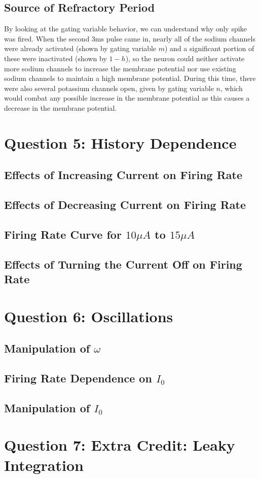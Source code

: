 \documentclass[11pt, oneside]{article}
\begin{document}
\subsection{Source of Refractory Period}
By looking at the gating variable behavior, we can understand why only spike was fired. When the second 3ms pulse came in, nearly all of the sodium channels were already activated (shown by gating variable $m$) and a significant portion of these were inactivated (shown by $1-h$), so the neuron could neither activate more sodium channels to increase the membrane potential nor use existing sodium channels to maintain a high membrane potential. During this time, there were also several potassium channels open, given by gating variable $n$, which would combat any possible increase in the membrane potential as this causes a decrease in the membrane potential.

\section{Question 5: History Dependence}

\subsection{Effects of Increasing Current on Firing Rate}

\subsection{Effects of Decreasing Current on Firing Rate}

\subsection{Firing Rate Curve for $10\mu A$ to $15\mu A$}

\subsection{Effects of Turning the Current Off on Firing Rate}

\section{Question 6: Oscillations}

\subsection{Manipulation of $\omega$}

\subsection{Firing Rate Dependence on $I_0$}

\subsection{Manipulation of $I_0$}

\section{Question 7: Extra Credit: Leaky Integration}
\end{document}
